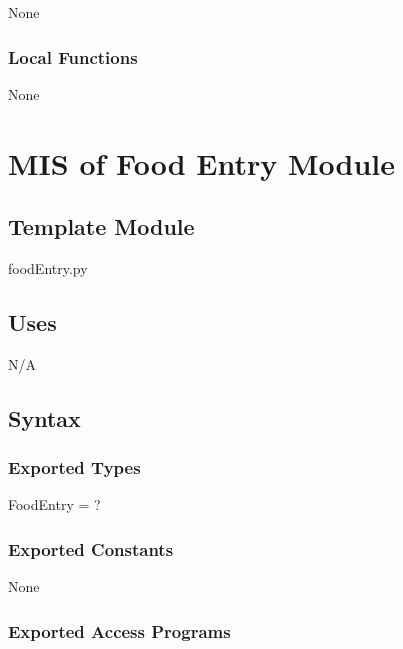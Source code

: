 \documentclass[12pt, titlepage]{article}
\begin{document}
None

\subsubsection{Local Functions}

None

\newpage

\section{MIS of Food Entry Module} \label{Module} 



\subsection{Template Module}

foodEntry.py

\subsection{Uses}
N/A

\subsection{Syntax}

\subsubsection{Exported Types}
FoodEntry = ?

\subsubsection{Exported Constants}
None

\subsubsection{Exported Access Programs}
\end{document}
